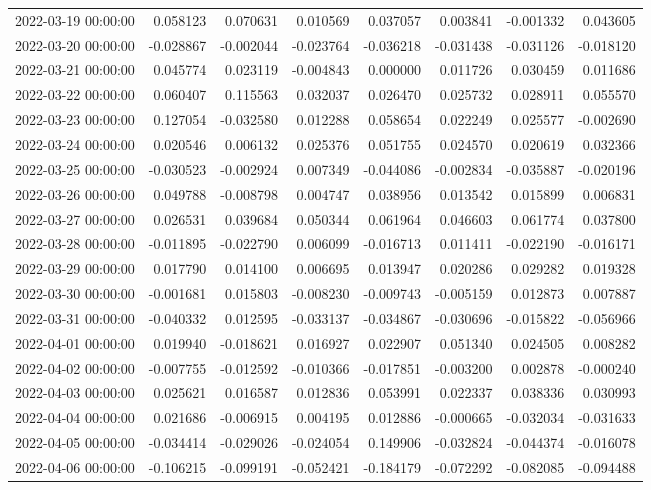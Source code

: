 \begin{tabular}{lrrrrrrr}
2022-03-19 00:00:00 & 0.058123 & 0.070631 & 0.010569 & 0.037057 & 0.003841 & -0.001332 & 0.043605 \\
2022-03-20 00:00:00 & -0.028867 & -0.002044 & -0.023764 & -0.036218 & -0.031438 & -0.031126 & -0.018120 \\
2022-03-21 00:00:00 & 0.045774 & 0.023119 & -0.004843 & 0.000000 & 0.011726 & 0.030459 & 0.011686 \\
2022-03-22 00:00:00 & 0.060407 & 0.115563 & 0.032037 & 0.026470 & 0.025732 & 0.028911 & 0.055570 \\
2022-03-23 00:00:00 & 0.127054 & -0.032580 & 0.012288 & 0.058654 & 0.022249 & 0.025577 & -0.002690 \\
2022-03-24 00:00:00 & 0.020546 & 0.006132 & 0.025376 & 0.051755 & 0.024570 & 0.020619 & 0.032366 \\
2022-03-25 00:00:00 & -0.030523 & -0.002924 & 0.007349 & -0.044086 & -0.002834 & -0.035887 & -0.020196 \\
2022-03-26 00:00:00 & 0.049788 & -0.008798 & 0.004747 & 0.038956 & 0.013542 & 0.015899 & 0.006831 \\
2022-03-27 00:00:00 & 0.026531 & 0.039684 & 0.050344 & 0.061964 & 0.046603 & 0.061774 & 0.037800 \\
2022-03-28 00:00:00 & -0.011895 & -0.022790 & 0.006099 & -0.016713 & 0.011411 & -0.022190 & -0.016171 \\
2022-03-29 00:00:00 & 0.017790 & 0.014100 & 0.006695 & 0.013947 & 0.020286 & 0.029282 & 0.019328 \\
2022-03-30 00:00:00 & -0.001681 & 0.015803 & -0.008230 & -0.009743 & -0.005159 & 0.012873 & 0.007887 \\
2022-03-31 00:00:00 & -0.040332 & 0.012595 & -0.033137 & -0.034867 & -0.030696 & -0.015822 & -0.056966 \\
2022-04-01 00:00:00 & 0.019940 & -0.018621 & 0.016927 & 0.022907 & 0.051340 & 0.024505 & 0.008282 \\
2022-04-02 00:00:00 & -0.007755 & -0.012592 & -0.010366 & -0.017851 & -0.003200 & 0.002878 & -0.000240 \\
2022-04-03 00:00:00 & 0.025621 & 0.016587 & 0.012836 & 0.053991 & 0.022337 & 0.038336 & 0.030993 \\
2022-04-04 00:00:00 & 0.021686 & -0.006915 & 0.004195 & 0.012886 & -0.000665 & -0.032034 & -0.031633 \\
2022-04-05 00:00:00 & -0.034414 & -0.029026 & -0.024054 & 0.149906 & -0.032824 & -0.044374 & -0.016078 \\
2022-04-06 00:00:00 & -0.106215 & -0.099191 & -0.052421 & -0.184179 & -0.072292 & -0.082085 & -0.094488 \\

\end{tabular}
